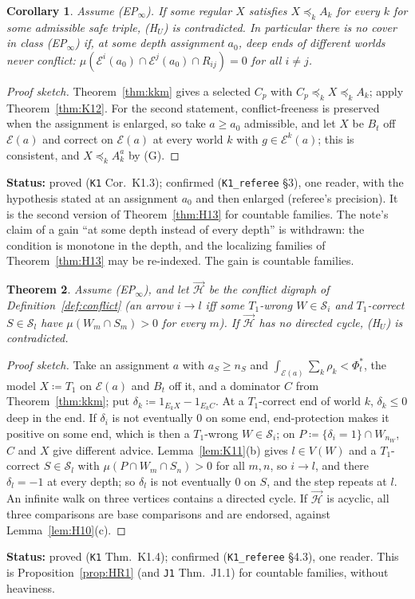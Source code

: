 \documentclass[11pt]{article}
\newtheorem{theorem}{Theorem}[section]
\newtheorem{corollary}[theorem]{Corollary}
\theoremstyle{definition}
\theoremstyle{remark}
\newcommand{\src}[1]{\texttt{#1}}
\newcommand{\status}[1]{\par\smallskip\noindent\textbf{Status:} #1\par\smallskip}
\begin{document}
\begin{corollary}\label{cor:K13}
Assume (EP$_\infty$). If some regular $X$ satisfies $X\preceq_kA_k$ for every $k$ for some admissible safe triple, (H$_U$) is contradicted. In particular there is no cover in class (EP$_\infty$) if, at some depth assignment $a_0$, deep ends of different worlds never conflict: $\mu(\mathcal E^i(a_0)\cap\mathcal E^j(a_0)\cap R_{ij})=0$ for all $i\ne j$.
\end{corollary}
\begin{proof}[Proof sketch]
Theorem~\ref{thm:kkm} gives a selected $C_p$ with $C_p\preceq_kX\preceq_kA_k$; apply Theorem~\ref{thm:K12}. For the second statement, conflict-freeness is preserved when the assignment is enlarged, so take $a\ge a_0$ admissible, and let $X$ be $B_t$ off $\mathcal E(a)$ and correct on $\mathcal E(a)$ at every world $k$ with $g\in\mathcal E^k(a)$; this is consistent, and $X\preceq_kA^a_k$ by (G).
\end{proof}
\status{proved (\src{K1} Cor.~K1.3); confirmed (\src{K1\_referee} \S3), one reader, with the hypothesis stated at an assignment $a_0$ and then enlarged (referee's precision). It is the second version of Theorem~\ref{thm:H13} for countable families. The note's claim of a gain ``at some depth instead of every depth'' is withdrawn: the condition is monotone in the depth, and the localizing families of Theorem~\ref{thm:H13} may be re-indexed. The gain is countable families.}

\begin{theorem}\label{thm:K14}
Assume (EP$_\infty$), and let $\vec{\mathcal H}$ be the conflict digraph of Definition~\ref{def:conflict} (an arrow $i\to l$ iff some $T_1$-wrong $W\in\mathcal S_i$ and $T_1$-correct $S\in\mathcal S_l$ have $\mu(W_m\cap S_m)>0$ for every $m$). If $\vec{\mathcal H}$ has no directed cycle, (H$_U$) is contradicted.
\end{theorem}
\begin{proof}[Proof sketch]
Take an assignment $a$ with $a_S\ge n_S$ and $\int_{\mathcal E(a)}\sum_k\rho_k<\Phi^*_t$, the model $X\coloneqq T_1$ on $\mathcal E(a)$ and $B_t$ off it, and a dominator $C$ from Theorem~\ref{thm:kkm}; put $\delta_k\coloneqq1_{E_kX}-1_{E_kC}$. At a $T_1$-correct end of world $k$, $\delta_k\le0$ deep in the end. If $\delta_i$ is not eventually $0$ on some end, end-protection makes it positive on some end, which is then a $T_1$-wrong $W\in\mathcal S_i$; on $P\coloneqq\{\delta_i=1\}\cap W_{n_W}$, $C$ and $X$ give different advice. Lemma~\ref{lem:K11}(b) gives $l\in V(W)$ and a $T_1$-correct $S\in\mathcal S_l$ with $\mu(P\cap W_m\cap S_n)>0$ for all $m,n$, so $i\to l$, and there $\delta_l=-1$ at every depth; so $\delta_l$ is not eventually $0$ on $S$, and the step repeats at $l$. An infinite walk on three vertices contains a directed cycle. If $\vec{\mathcal H}$ is acyclic, all three comparisons are base comparisons and are endorsed, against Lemma~\ref{lem:H10}(c).
\end{proof}
\status{proved (\src{K1} Thm.~K1.4); confirmed (\src{K1\_referee} \S4.3), one reader. This is Proposition~\ref{prop:HR1} (and \src{J1} Thm.~J1.1) for countable families, without heaviness.}
\end{document}
